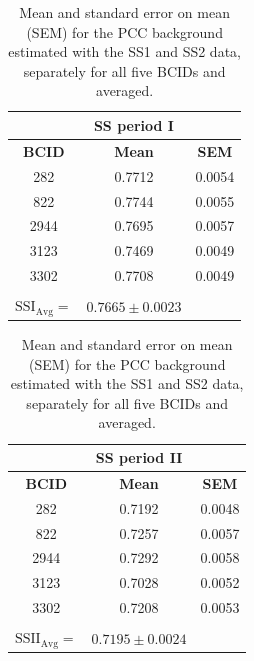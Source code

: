 \newpage
\begin{table}[h!]
  \begin{center}
    \caption{Mean and standard error on mean (SEM) for the PCC background estimated with the SS1 and SS2 data, separately for all five BCIDs and averaged.}
    \label{ss_per_bx}
    \begin{tabular}{|c | c | c | }
      \multicolumn{1}{c}{} & \multicolumn{1}{c}{\textbf{SS period I}} & \multicolumn{1}{c}{}  \\
      \hline
 \textbf{BCID}   & \textbf{Mean}   &  \textbf{SEM}\\
     \hline %
      282 & 0.7712 & 0.0054\\
      \hline
      822 & 0.7744 & 0.0055\\ 
      \hline
      2944 & 0.7695 & 0.0057\\ 
      \hline
      3123 & 0.7469 & 0.0049\\ 
      \hline
      3302 & 0.7708 & 0.0049\\ 
      \hline
      \multicolumn{1}{c}{} & \multicolumn{1}{c}{} & \multicolumn{1}{c}{}\\
      \multicolumn{1}{c}{$\text{SSI}_{\text{Avg}}=$} & \multicolumn{1}{l}{$0.7665 \pm 0.0023$} & \multicolumn{1}{c}{}\\
    \end{tabular}
    \hspace{0.5cm}
    \begin{tabular}{|c | c | c | }
      \multicolumn{1}{c}{} & \multicolumn{1}{c}{\textbf{SS period II}} & \multicolumn{1}{c}{ }  \\
      \hline
 \textbf{BCID}   & \textbf{Mean}   &  \textbf{SEM}\\
     \hline %
      282 & 0.7192 & 0.0048\\
      \hline
      822 & 0.7257 & 0.0057\\ 
      \hline
      2944 & 0.7292 & 0.0058\\ 
      \hline
      3123 & 0.7028 & 0.0052\\ 
      \hline
      3302 & 0.7208 & 0.0053\\ 
      \hline
      \multicolumn{1}{c}{} & \multicolumn{1}{c}{} & \multicolumn{1}{c}{}\\
      \multicolumn{1}{c}{$\text{SSII}_{\text{Avg}}=$} & \multicolumn{1}{l}{$ 0.7195 \pm 0.0024$} & \multicolumn{1}{c}{}
    \end{tabular}   
  \end{center}
\end{table}

